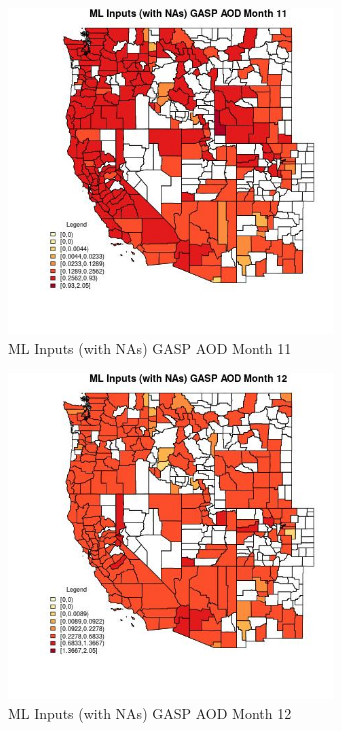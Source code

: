 \begin{figure} 
\centering  
\includegraphics[width=0.77\textwidth]{Code_Outputs/Report_ML_input_PM25_Step4_part_e_de_duplicated_aves_compiled_2019-05-21wNAs_CountyGASP_AODmedianMonth11.jpg} 
\caption{\label{fig:Report_ML_input_PM25_Step4_part_e_de_duplicated_aves_compiled_2019-05-21wNAsCountyGASP_AODmedianMonth11}ML Inputs (with NAs) GASP AOD Month 11} 
\end{figure} 
 

\begin{figure} 
\centering  
\includegraphics[width=0.77\textwidth]{Code_Outputs/Report_ML_input_PM25_Step4_part_e_de_duplicated_aves_compiled_2019-05-21wNAs_CountyGASP_AODmedianMonth12.jpg} 
\caption{\label{fig:Report_ML_input_PM25_Step4_part_e_de_duplicated_aves_compiled_2019-05-21wNAsCountyGASP_AODmedianMonth12}ML Inputs (with NAs) GASP AOD Month 12} 
\end{figure} 
 

